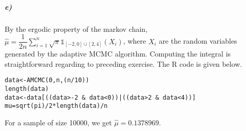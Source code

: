\documentclass{article}
\begin{document}
\subparagraph{e)}
By the ergodic property of the markov chain, $\displaystyle \widehat{\mu}=\dfrac{1}{2n}\sum_{i=1}^n \sqrt{\pi} \mathds{1}_{[-2,0]\cup [2,4] }(X_i)$, where $X_i$ are the random variables generated by the adaptive MCMC algorithm. Computing the integral is straightforward regarding to preceding exercise. The R code is given below.
\begin{verbatim}
data<-AMCMC(0,n,(n/10))
length(data)
data<-data[((data>-2 & data<0))|((data>2 & data<4))]
mu=sqrt(pi)/2*length(data)/n
\end{verbatim}
For a sample of size 10000, we get $\widehat{\mu}=0.1378969$.
\end{document}
